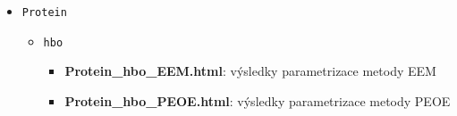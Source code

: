 \begin{itemize}
\begin{itemize}
        \item \verb|Protein|
            \begin{itemize}
                \item \verb|hbo|
                \begin{itemize}                \item \textbf{Protein\_hbo\_EEM.html}: výsledky parametrizace metody EEM
                \item \textbf{Protein\_hbo\_PEOE.html}: výsledky parametrizace metody PEOE
                \end{itemize}
            \end{itemize}
    \end{itemize}
\end{itemize}



